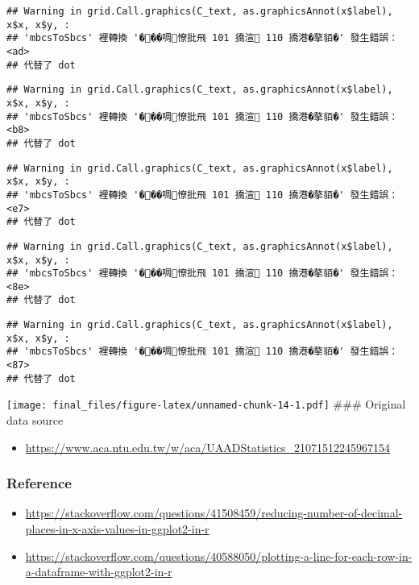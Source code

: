 \documentclass[
]{article}
\providecommand{\tightlist}{%
  \setlength{\itemsep}{0pt}\setlength{\parskip}{0pt}}
\begin{document}
\begin{verbatim}
## Warning in grid.Call.graphics(C_text, as.graphicsAnnot(x$label), x$x, x$y, :
## 'mbcsToSbcs' 裡轉換 '���啁憭批飛 101 撟渲 110 撟港�摮貊�' 發生錯誤：<ad>
## 代替了 dot
\end{verbatim}

\begin{verbatim}
## Warning in grid.Call.graphics(C_text, as.graphicsAnnot(x$label), x$x, x$y, :
## 'mbcsToSbcs' 裡轉換 '���啁憭批飛 101 撟渲 110 撟港�摮貊�' 發生錯誤：<b8>
## 代替了 dot
\end{verbatim}

\begin{verbatim}
## Warning in grid.Call.graphics(C_text, as.graphicsAnnot(x$label), x$x, x$y, :
## 'mbcsToSbcs' 裡轉換 '���啁憭批飛 101 撟渲 110 撟港�摮貊�' 發生錯誤：<e7>
## 代替了 dot
\end{verbatim}

\begin{verbatim}
## Warning in grid.Call.graphics(C_text, as.graphicsAnnot(x$label), x$x, x$y, :
## 'mbcsToSbcs' 裡轉換 '���啁憭批飛 101 撟渲 110 撟港�摮貊�' 發生錯誤：<8e>
## 代替了 dot
\end{verbatim}

\begin{verbatim}
## Warning in grid.Call.graphics(C_text, as.graphicsAnnot(x$label), x$x, x$y, :
## 'mbcsToSbcs' 裡轉換 '���啁憭批飛 101 撟渲 110 撟港�摮貊�' 發生錯誤：<87>
## 代替了 dot
\end{verbatim}

\texttt{[image: final\_files/figure-latex/unnamed-chunk-14-1.pdf]} \#\#\#
Original data source

\begin{itemize}
\tightlist
\item
  \url{https://www.aca.ntu.edu.tw/w/aca/UAADStatistics_21071512245967154}
\end{itemize}

\hypertarget{reference}{%
\subsubsection{Reference}\label{reference}}

\begin{itemize}
\tightlist
\item
  \url{https://stackoverflow.com/questions/41508459/reducing-number-of-decimal-places-in-x-axis-values-in-ggplot2-in-r}
\item
  \url{https://stackoverflow.com/questions/40588050/plotting-a-line-for-each-row-in-a-dataframe-with-ggplot2-in-r}
\end{itemize}
\end{document}

